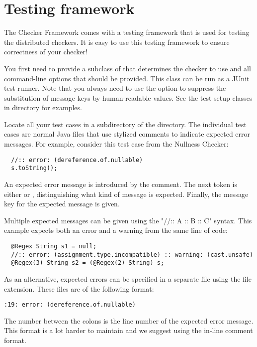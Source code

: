 \section{Testing framework\label{testing-framework}}

The Checker Framework comes with a testing framework that is used for
testing the distributed checkers.
It is easy to use this testing framework to ensure correctness of your
checker!

You first need to provide a subclass of
that determines the checker to use and all command-line options that
should be provided.
This class can be run as a JUnit test runner.
Note that you always need to use the
 option to suppress the substitution of message keys
by human-readable values.
See the test setup classes in directory  for examples.

Locate all your test cases in a subdirectory of the 
directory.
The individual test cases are normal Java files that use stylized
comments to indicate expected error messages.
For example, consider this test case from the Nullness Checker:

\begin{Verbatim}
  //:: error: (dereference.of.nullable)
  s.toString();
\end{Verbatim}

An expected error message is introduced by the \code{//::} comment.
The next token is either  or ,
distinguishing what kind of message is expected.
Finally, the message key for the expected message is given.

Multiple expected messages can be given using the "//:: A :: B :: C"
syntax.
This example expects both an error and a warning from the same line of code:

\begin{Verbatim}
  @Regex String s1 = null;
  //:: error: (assignment.type.incompatible) :: warning: (cast.unsafe)
  @Regex(3) String s2 = (@Regex(2) String) s;
\end{Verbatim}

As an alternative, expected errors can be specified in a separate file
using the  file extension.
These files are of the following format:

\begin{Verbatim}
:19: error: (dereference.of.nullable)
\end{Verbatim}

The number between the colons is the line number of the expected error
message.
This format is a lot harder to maintain and we suggest using the
in-line comment format.



